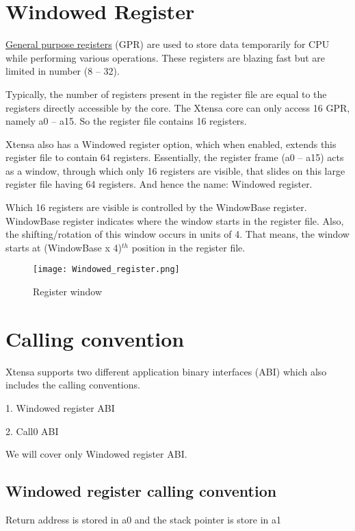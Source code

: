 \section{Windowed Register}

\underline{General purpose registers} (GPR) are used to store data temporarily for CPU while performing various operations. These registers are blazing fast but are limited in number (8 -- 32).

Typically, the number of registers present in the register file are equal to the registers directly accessible by the core. The Xtensa core can only access 16 GPR, namely a0 -- a15. So the register file contains 16 registers.

Xtensa also has a Windowed register option, which when enabled, extends this register file to contain 64 registers. Essentially, the register frame (a0 -- a15) acts as a window, through which only 16 registers are visible, that slides on this large register file having 64 registers. And hence the name: Windowed register.

Which 16 registers are visible is controlled by the WindowBase register. WindowBase register indicates where the window starts in the register file. Also, the shifting/rotation of this window occurs in units of 4. That means, the window starts at (WindowBase x 4)$^{th}$ position in the register file.

\begin{figure}[p]
    \center
    \texttt{[image: Windowed\_register.png]}
    \caption{Register window}
    \label{fig:register-window}
\end{figure}

\section{Calling convention}

Xtensa supports two different application binary interfaces (ABI) which also includes the calling conventions.

1. Windowed register ABI

2. Call0 ABI

We will cover only Windowed register ABI.

\subsection{Windowed register calling convention}

Return address is stored in a0 and the stack pointer is store in a1

